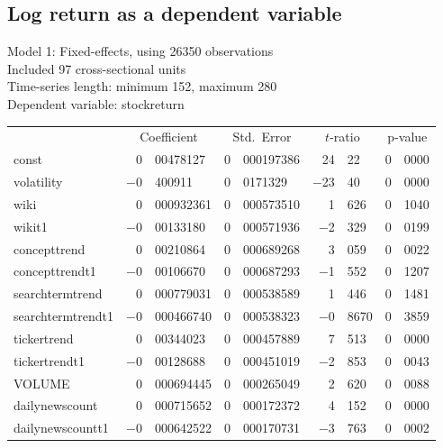 \subsection{Log return as a dependent variable}
\begin{center}

Model 1: Fixed-effects, using 26350 observations\\
Included 97 cross-sectional units\\
Time-series length: minimum 152, maximum 280\\
Dependent variable: stockreturn\\

\vspace{1em}

\begin{tabular}{lr@{,}lr@{,}lr@{,}lr@{,}l}
  &
 \multicolumn{2}{c}{Coefficient} &
  \multicolumn{2}{c}{Std.\ Error} &
   \multicolumn{2}{c}{$t$-ratio} &
    \multicolumn{2}{c}{p-value} \\[1ex]
const &
  0&00478127 &
    0&000197386 &
      24&22 &
        0&0000 \\
volatility &
  $-$0&400911 &
    0&0171329 &
      $-$23&40 &
        0&0000 \\
wiki &
  0&000932361 &
    0&000573510 &
      1&626 &
        0&1040 \\
wikit1 &
  $-$0&00133180 &
    0&000571936 &
      $-$2&329 &
        0&0199 \\
concepttrend &
  0&00210864 &
    0&000689268 &
      3&059 &
        0&0022 \\
concepttrendt1 &
  $-$0&00106670 &
    0&000687293 &
      $-$1&552 &
        0&1207 \\
searchtermtrend &
  0&000779031 &
    0&000538589 &
      1&446 &
        0&1481 \\
searchtermtrendt1 &
  $-$0&000466740 &
    0&000538323 &
      $-$0&8670 &
        0&3859 \\
tickertrend &
  0&00344023 &
    0&000457889 &
      7&513 &
        0&0000 \\
tickertrendt1 &
  $-$0&00128688 &
    0&000451019 &
      $-$2&853 &
        0&0043 \\
VOLUME &
  0&000694445 &
    0&000265049 &
      2&620 &
        0&0088 \\
dailynewscount &
  0&000715652 &
    0&000172372 &
      4&152 &
        0&0000 \\
dailynewscountt1 &
  $-$0&000642522 &
    0&000170731 &
      $-$3&763 &
        0&0002 \\
\end{tabular}


\end{center}
